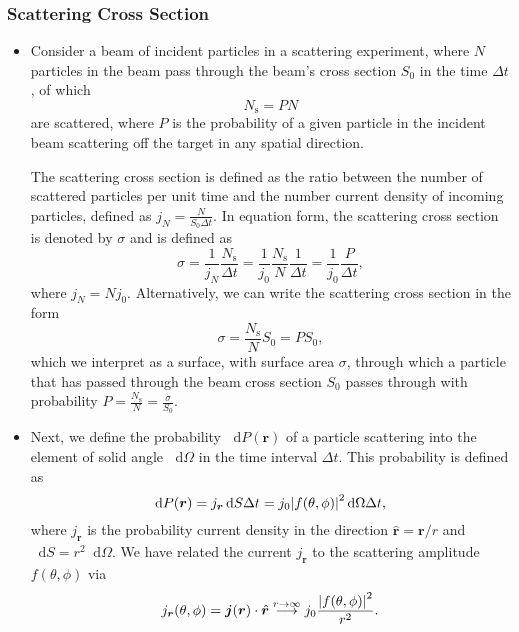 \documentclass[11pt, a4paper]{article}
\newcommand{\diff}{\mathop{}\!\mathrm{d}} %
\renewcommand{\vec}[1]{\bm{#1}}  %
\newcommand{\uvec}[1]{\hat{\vec{#1}}}  %
\renewcommand{\r}{\vec{r}}  %
\begin{document}
\subsubsection{Scattering Cross Section}
\begin{itemize}
    \item Consider a beam of incident particles in a scattering experiment, where $ N $ particles in the beam pass through the beam's cross section $ S_{0} $ in the time $ \Delta t $, of which 
    \begin{equation*}
        N_{\text{s}} = P N
    \end{equation*}
    are scattered, where $ P $ is the probability of a given particle in the incident beam scattering off the target in any spatial direction. 

    The scattering cross section is defined as the ratio between the number of scattered particles per unit time and the number current density of incoming particles, defined as $ j_{N} = \frac{N}{S_{0}\Delta t}$. In equation form, the scattering cross section is denoted by $ \sigma $ and is defined as
    \begin{equation*}
        \sigma = \frac{1}{j_{N}}  \frac{N_{\text{s}}}{\Delta t} = \frac{1}{j_{0}} \frac{N_{\text{s}}}{N} \frac{1}{\Delta t} = \frac{1}{j_{0}} \frac{P}{\Delta t},
    \end{equation*}
    where $ j_{N} = N j_{0} $. Alternatively, we can write the scattering cross section in the form
    \begin{equation*}
        \sigma = \frac{N_{\text{s}}}{N}S_{0} = P S_{0},
    \end{equation*}
    which we interpret as a surface, with surface area $ \sigma $, through which a particle that has passed through the beam cross section $ S_{0} $ passes through with probability $ P = \frac{N_{\text{s}}}{N} = \frac{\sigma}{S_{0}}$.

    \item Next, we define the probability $ \diff P(\r) $ of a particle scattering into the element of solid angle $ \diff \Omega $ in the time interval $ \Delta t $. This probability is defined as
    \begin{equation*}
        \diff P(\r) = j_{\r} \diff S \Delta t = j_{0} \abs{f(\theta, \phi)}^{2} \diff \Omega \Delta t,
    \end{equation*}
    where $ j_{\r} $ is the probability current density in the direction $ \uvec{r} = \r /r $ and $ \diff S = r^{2} \diff \Omega $. We have related the current $ j_{\r} $ to the scattering amplitude $ f(\theta, \phi) $ via
    \begin{equation*}
        j_{\r}(\theta, \phi) = \vec{j}(\r) \cdot \uvec{r} \stackrel{r \to \infty}{\longrightarrow} j_{0} \frac{\abs{f(\theta, \phi)}^{2}}{r^{2}}.
    \end{equation*}


\end{itemize}
\end{document}
